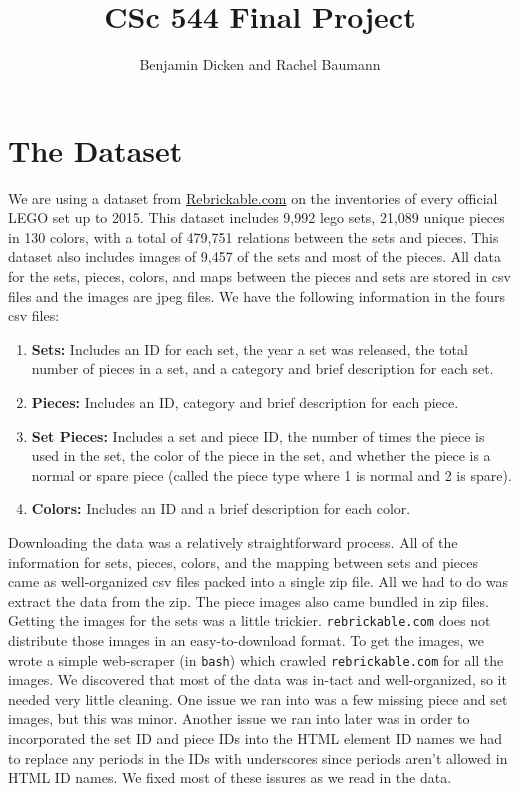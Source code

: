 \documentclass[a4paper, 12pt]{article}
\title{CSc 544 Final Project}
\author{Benjamin Dicken and Rachel Baumann}
\begin{document}
\maketitle

\section*{The Dataset}

%
%

We are using a dataset from \href{http://rebrickable.com/}{Rebrickable.com} on the inventories of every official LEGO set up to 2015. This dataset includes 9,992 lego sets, 21,089 unique pieces in 130 colors, with a total of 479,751 relations between the sets and pieces. This dataset also includes images of 9,457 of the sets and most of the pieces. All data for the sets, pieces, colors, and maps between the pieces and sets are stored in csv files and the images are jpeg files. We have the following information in the fours csv files:

\begin{enumerate}

\item {\bf Sets:} Includes an ID for each set, the year a set was released, the total number of pieces in a set, and a category and brief description for each set.

\item {\bf Pieces:} Includes an ID, category and brief description for each piece.

\item {\bf Set Pieces:} Includes a set and piece ID, the number of times the piece is used in the set, the color of the piece in the set, and whether the piece is a normal or spare piece (called the piece type where 1 is normal and 2 is spare).


\item {\bf Colors:} Includes an ID and a brief description for each color.

\end{enumerate}

Downloading the data was a relatively straightforward process. All of the information for sets, pieces, colors, and the mapping between sets and pieces came as well-organized csv files packed into a single zip file. All we had to do was extract the data from the zip. The piece images also came bundled in zip files. Getting the images for the sets was a little trickier. \texttt{rebrickable.com} does not distribute those images in an easy-to-download format. To get the images, we wrote a simple web-scraper (in \texttt{bash}) which crawled \texttt{rebrickable.com} for all the images. We discovered that most of the data was in-tact and well-organized, so it needed very little cleaning. One issue we ran into was a few missing piece and set images, but this was minor. Another issue we ran into later was in order to incorporated the set ID and piece IDs into the HTML element ID names we had to replace any periods in the IDs with underscores since periods aren't allowed in HTML ID names. We fixed most of these issures as we read in the data.
\end{document}
